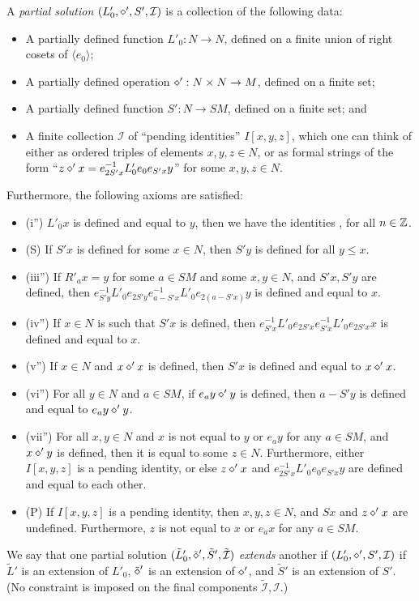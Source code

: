 \begin{definition}\label{part-sol}  A \emph{partial solution} $(L'_0, \diamond', S', {\mathcal I})$ is a collection of the following data:
\begin{itemize}
  \item A partially defined function $L'_0: N \to N$, defined on a finite union of right cosets of $\langle e_0\rangle$;
  \item A partially defined operation $\diamond': N \times N \to M$, defined on a finite set;
  \item A partially defined function $S': N \to SM$, defined on a finite set; and
  \item A finite collection ${\mathcal  I}$ of ``pending identities'' $I[x,y,z]$, which one can think of either as ordered triples of elements $x,y,z \in N$, or as formal strings of the form ``$z \diamond' x = e_{2S'x}^{-1} L'_0 e_0 e_{S'x} y$'' for some $x,y,z \in N$.
\end{itemize}

Furthermore, the following axioms are satisfied:
\begin{itemize}
  \item (i'')  $L'_0 x$ is defined and equal to $y$, then we have the identities ,  for all $n\in \mathbb{Z}$.
  \item (S) If $S'x$ is defined for some $x \in N$, then $S'y$ is defined for all $y \leq x$.
  \item (iii'') If $R'_a x = y$ for some $a \in SM$ and some $x,y \in N$, and $S'x, S'y$ are defined, then $e_{S'y}^{-1} L'_0 e_{2S'y} e_{a-S'x}^{-1} L'_0 e_{2(a-S'x)} y$ is defined and equal to $x$.
  \item (iv'') If $x \in N$ is such that $S'x$ is defined, then $e_{S'x}^{-1} L'_0 e_{2S'x} e_{S'x}^{-1} L'_0 e_{2S'x} x$ is defined and equal to $x$.
  \item (v'')  If $x \in N$ and $x \diamond' x$ is defined, then $S'x$ is defined and equal to $x \diamond' x$.
  \item (vi'')  For all $y \in N$ and $a \in SM$, if $e_a y \diamond' y$ is defined, then $a - S'y$ is defined and equal to $e_a y \diamond' y$.
  \item (vii'')  For all $x,y \in N$ and $x$ is not equal to $y$ or $e_a y$ for any $a \in SM$, and $x \diamond' y$ is defined, then it is equal to some $z \in N$.  Furthermore, either $I[x,y,z]$ is a pending identity, or else $z \diamond' x$ and $e_{2S'x}^{-1} L'_0 e_0 e_{S'x} y$ are defined and equal to each other.
  \item (P) If $I[x,y,z]$ is a pending identity, then $x,y,z \in N$, and $Sx$ and $z \diamond' x$ are undefined.  Furthermore, $z$ is not equal to $x$ or $e_a x$ for any $a \in SM$.
\end{itemize}

We say that one partial solution $(\tilde L'_0, \tilde {\diamond}', \tilde S', \tilde {\mathcal I})$ \emph{extends} another if $(L'_0, \diamond', S',  {\mathcal I})$ if $\tilde L'$ is an extension of $L'_0$, $\tilde {\diamond}'$ is an extension of $\diamond'$, and $\tilde S'$ is an extension of $S'$.  (No constraint is imposed on the final components $\tilde {\mathcal I}, {\mathcal I}$.)
\end{definition}

